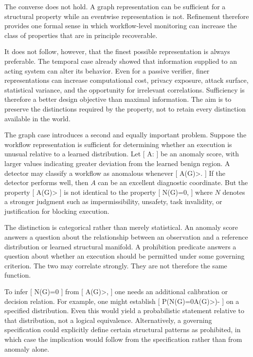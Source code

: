 \documentclass[11pt]{article}
\begin{document}
The converse does not hold. A graph representation can be sufficient for a structural property while an eventwise representation is not. Refinement therefore provides one formal sense in which workflow-level monitoring can increase the class of properties that are in principle recoverable.

It does not follow, however, that the finest possible representation is always preferable. The temporal case already showed that information supplied to an acting system can alter its behavior. Even for a passive verifier, finer representations can increase computational cost, privacy exposure, attack surface, statistical variance, and the opportunity for irrelevant correlations. Sufficiency is therefore a better design objective than maximal information. The aim is to preserve the distinctions required by the property, not to retain every distinction available in the world.

The graph case introduces a second and equally important problem. Suppose the workflow representation is sufficient for determining whether an execution is unusual relative to a learned distribution. Let
[
A:\rightarrow{}
]
be an anomaly score, with larger values indicating greater deviation from the learned benign region. A detector may classify a workflow as anomalous whenever
[
A(G)>\tau.
]
If the detector performs well, then $A$ can be an excellent diagnostic coordinate. But the property
[
A(G)>\tau
]
is not identical to the property
[
N(G)=0,
]
where $N$ denotes a stronger judgment such as impermissibility, unsafety, task invalidity, or justification for blocking execution.

The distinction is categorical rather than merely statistical. An anomaly score answers a question about the relationship between an observation and a reference distribution or learned structural manifold. A prohibition predicate answers a question about whether an execution should be permitted under some governing criterion. The two may correlate strongly. They are not therefore the same function.

To infer
[
N(G)=0
]
from
[
A(G)>\tau,
]
one needs an additional calibration or decision relation. For example, one might establish
[
P(N(G)=0\mid A(G)>\tau)-\varepsilon
]
on a specified distribution. Even this would yield a probabilistic statement relative to that distribution, not a logical equivalence. Alternatively, a governing specification could explicitly define certain structural patterns as prohibited, in which case the implication would follow from the specification rather than from anomaly alone.
\end{document}
